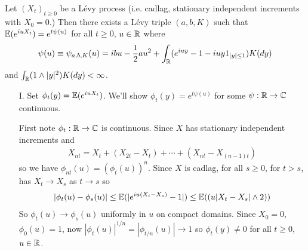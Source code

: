 \documentclass[12pt,a4paper]{report}
\newenvironment{proof}
{\begin{changemargin}{1cm}{0.5cm} 
	}%
	{\end{changemargin}
}
\begin{document}
 Let $(X_t)_{t\geq 0}$ be a L\'{e}vy process (i.e. cadlag, stationary independent increments with $X_0=0$.) Then there exists a L\'{e}vy triple $(a,b,K)$ such that $\mathbb{E}(e^{iuX_t}) = e^{t\psi(u)}$ for all $t\geq 0$, $u \in \mathbb{R}$ where
\begin{align*}
\psi(u) \equiv \psi_{a,b,K}(u) =ibu - \frac{1}{2}au^2 + \int_{\mathbb{R}} (e^{iuy}-1-iuy 1_{|y|\leq 1}) K(dy)
\end{align*}
and $\int_{\mathbb{R}} (1\wedge |y|^2) K(dy) < \infty$.
\begin{proof}
\pf
\begin{itemize}
\item[I.] Set $\phi_t(y) = \mathbb{E}(e^{iuX_t})$. We'll show $\phi_t(y) = e^{t\psi(u)}$ for some $\psi : \mathbb{R} \rightarrow \mathbb{C}$ continuous.

\quad First note $\phi_t : \mathbb{R} \rightarrow \mathbb{C}$ is continuous. Since $X$ has stationary independent increments and
\begin{align*}
X_{nt} = X_t + (X_{2t} - X_t) + \cdots + (X_{nt}- X_{(n-1)t})
\end{align*}
so we have $\phi_{nt}(u) = (\phi_t(u))^n$. Since $X$ is cadlag, for all $s\geq 0$, for $t>s$, has $X_t \rightarrow X_s$ as $t\rightarrow s$ so 
\begin{align*}
| \phi_t(u) - \phi_s(u)| \leq \mathbb{E} (|e^{iu(X_t-X_s)} -1|) \leq \mathbb{E}((u|X_t-X_s|\wedge 2))
\end{align*}
So $\phi_t(u) \rightarrow \phi_s(u)$ uniformly in $u$ on compact domains. Since $X_0 =0$, $\phi_0(u)=1$, now $|\phi_t(u)|^{1/n} = |\phi_{t/n}(u)| \rightarrow 1$ so $\phi_t(y) \neq 0$ for all $t\geq 0$, $u\in \mathbb{R}$.


\end{itemize}
\end{proof}
\end{document}
